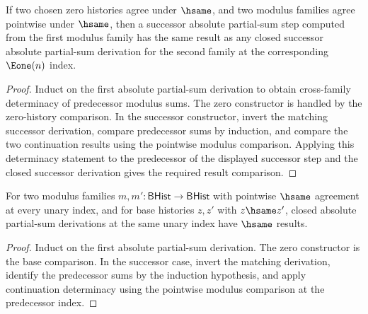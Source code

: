 \begin{lemma}
\label{lem:complex-abs-part-sum-successor-modulus-hsame-deterministic}
If two chosen zero histories agree under $\hsame$, and two modulus families
agree pointwise under $\hsame$, then a successor absolute partial-sum step
computed from the first modulus family has the same result as any closed
successor absolute partial-sum derivation for the second family at the
corresponding $\Eone(n)$ index.
\end{lemma}
\begin{proof}
Induct on the first absolute partial-sum derivation to obtain cross-family
determinacy of predecessor modulus sums. The zero constructor is handled by the
zero-history comparison. In the successor constructor, invert the matching
successor derivation, compare predecessor sums by induction, and compare the
two continuation results using the pointwise modulus comparison. Applying this
determinacy statement to the predecessor of the displayed successor step and
the closed successor derivation gives the required result comparison.
\end{proof}

\begin{lemma}
\label{lem:complex-abs-part-sum-pointwise-hsame-deterministic}
For two modulus families $m,m':\mathsf{BHist}\to\mathsf{BHist}$ with pointwise
$\hsame$ agreement at every unary index, and for base histories $z,z'$ with
$z\hsame z'$, closed absolute partial-sum derivations at the same unary index
have $\hsame$ results.
\end{lemma}
\begin{proof}
Induct on the first absolute partial-sum derivation. The zero constructor is
the base comparison. In the successor case, invert the matching derivation,
identify the predecessor sums by the induction hypothesis, and apply
continuation determinacy using the pointwise modulus comparison at the
predecessor index.
\end{proof}

